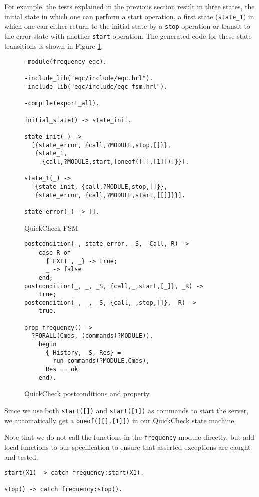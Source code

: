 \documentclass[]{sigplanconf}
\begin{document}
For example, the tests explained in the previous section result in three states, the initial state in which one can perform a start operation, a first state (\verb+state_1+) in which one can either return to the initial state by a \verb+stop+ operation or transit to the error state with another \verb+start+ operation. The generated code for these state transitions is shown in Figure \ref{qc-fsm}.

\begin{figure}
\begin{verbatim}
-module(frequency_eqc).

-include_lib("eqc/include/eqc.hrl").
-include_lib("eqc/include/eqc_fsm.hrl").

-compile(export_all).

initial_state() -> state_init.

state_init(_) ->
  [{state_error, {call,?MODULE,stop,[]}},
   {state_1,
     {call,?MODULE,start,[oneof([[],[1]])]}}].

state_1(_) ->
  [{state_init, {call,?MODULE,stop,[]}},
   {state_error, {call,?MODULE,start,[[]]}}].

state_error(_) -> [].
\end{verbatim}
\caption{QuickCheck FSM}
\label{qc-fsm}
\end{figure}

\begin{figure}
\begin{verbatim}
postcondition(_, state_error, _S, _Call, R) ->
    case R of
      {'EXIT', _} -> true;
      _ -> false
    end;
postcondition(_, _, _S, {call,_,start,[_]}, _R) ->
    true;
postcondition(_, _, _S, {call,_,stop,[]}, _R) ->
    true.

prop_frequency() ->
  ?FORALL(Cmds, (commands(?MODULE)),
    begin
      {_History, _S, Res} = 
        run_commands(?MODULE,Cmds), 
      Res == ok
    end).      
\end{verbatim}             
\caption{QuickCheck postconditions and property}
\label{qc-props}
\end{figure}


Since we use both \verb+start([])+ and \verb+start([1])+ as commands to start the server, we automatically get a \verb+oneof([[],[1]])+ in our QuickCheck state machine.

Note that we do not call the functions in the \verb+frequency+ module directly, but add local functions to our specification to ensure that asserted exceptions are caught and tested.
\begin{verbatim}
start(X1) -> catch frequency:start(X1).

stop() -> catch frequency:stop().
\end{verbatim}
\end{document}

